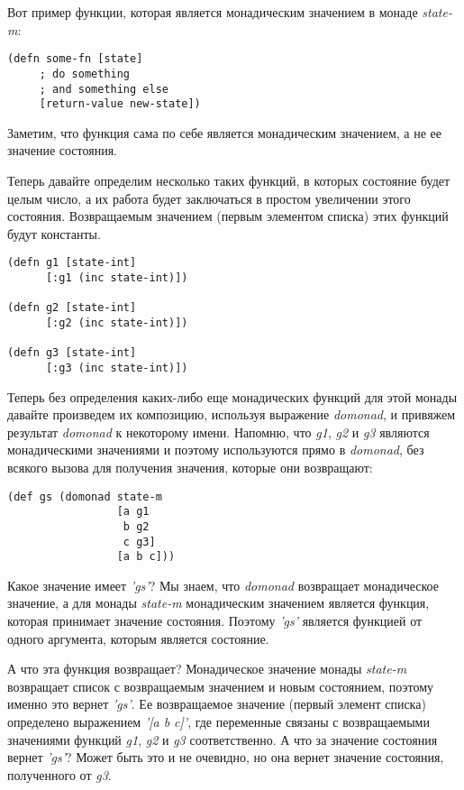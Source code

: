 \documentclass[a4paper,12pt]{article}
\newcommand{\cl}[1] {{\it #1}}
\begin{document}
Вот пример функции, которая является монадическим значением в монаде \cl{state-m}:

\begin{verbatim}
(defn some-fn [state]
     ; do something
     ; and something else
     [return-value new-state])
\end{verbatim}

Заметим, что функция сама по себе является монадическим значением, а не ее значение состояния.

Теперь давайте определим несколько таких функций, в которых состояние будет целым число, а их
работа будет заключаться в простом увеличении этого состояния. Возвращаемым значением (первым элементом
списка) этих функций будут константы.

\begin{verbatim}
(defn g1 [state-int]
      [:g1 (inc state-int)])

(defn g2 [state-int]
      [:g2 (inc state-int)])

(defn g3 [state-int]
      [:g3 (inc state-int)])
\end{verbatim}

Теперь без определения каких-либо еще монадических функций для этой монады давайте произведем
их композицию, используя выражение \cl{domonad}, и привяжем результат \cl{domonad} к некоторому имени. 
Напомню, что \cl{g1}, \cl{g2} и \cl{g3} являются монадическими значениями и поэтому используются прямо в
\cl{domonad}, без всякого вызова для получения значения, которые они возвращают:

\begin{verbatim}
(def gs (domonad state-m
                 [a g1
                  b g2
                  c g3]
                 [a b c]))
\end{verbatim}

Какое значение имеет \cl{'gs'}? Мы знаем, что \cl{domonad} возвращает монадическое значение, а для монады
\cl{state-m} монадическим значением является функция, которая принимает значение состояния. Поэтому
\cl{'gs'} является функцией от одного аргумента, которым является состояние. 

А что эта функция возвращает? Монадическое значение монады \cl{state-m} возвращает список
с возвращаемым значением и новым состоянием, поэтому именно это вернет \cl{'gs'}. Ее возвращаемое
значение (первый элемент списка) определено выражением  \cl{'[a b c]'}, где переменные связаны с возвращаемыми значениями
функций \cl{g1}, \cl{g2} и \cl{g3} соответственно. А что за значение состояния вернет \cl{'gs'}? Может быть это и 
не очевидно, но она вернет значение состояния, полученного от \cl{g3}. 
\end{document}
